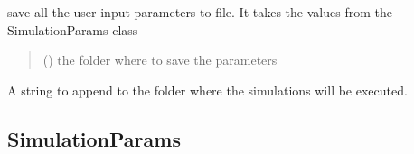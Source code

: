 \documentclass[letterpaper,10pt,english]{sphinxmanual}
\begin{document}
\begin{fulllineitems}
\begin{fulllineitems}
\end{fulllineitems}


\begin{fulllineitems}
\label{\detokenize{code_documentation:raypyng.simulate.Simulate.save_parameters_to_file}}
\pysigstartsignatures
{}
\pysigstopsignatures
\sphinxAtStartPar
save all the user input parameters to file. It takes the values
from the SimulationParams class
\begin{quote}\begin{description}
\sphinxAtStartPar
{} () \textendash{} the folder where to save the parameters

\end{description}\end{quote}

\end{fulllineitems}


\begin{fulllineitems}
\label{\detokenize{code_documentation:raypyng.simulate.Simulate.simulation_name}}
\pysigstartsignatures
{}
\pysigstopsignatures
\sphinxAtStartPar
A string to append to the folder where the simulations will be executed.

\end{fulllineitems}


\end{fulllineitems}



\subsection{SimulationParams}
\label{\detokenize{code_documentation:simulationparams}}
\end{document}
